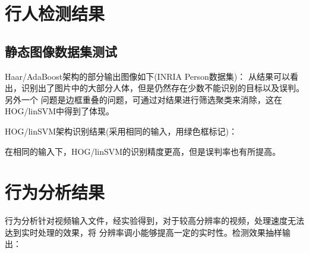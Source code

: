\section{行人检测结果}
\subsection{静态图像数据集测试}
Haar/AdaBoost架构的部分输出图像如下(INRIA Person数据集)：
从结果可以看出，识别出了图片中的大部分人体，但是仍然存在少数不能识别的目标以及误判。另外一个
问题是边框重叠的问题，可通过对结果进行筛选聚类来消除，这在HOG/linSVM中得到了体现。

HOG/linSVM架构识别结果(采用相同的输入，用绿色框标记)：

在相同的输入下，HOG/linSVM的识别精度更高，但是误判率也有所提高。

\section{行为分析结果}
行为分析针对视频输入文件，经实验得到，对于较高分辨率的视频，处理速度无法达到实时处理的效果，将
分辨率调小能够提高一定的实时性。检测效果抽样输出：
